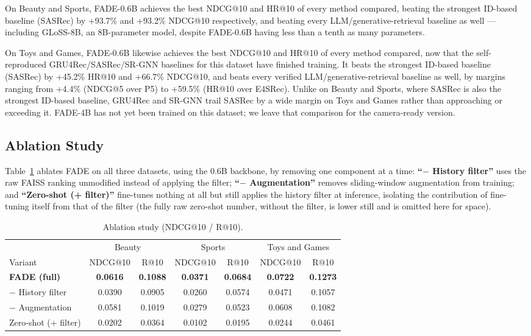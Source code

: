 \documentclass[runningheads]{llncs}
\begin{document}
On Beauty and Sports, FADE-0.6B achieves the best NDCG@10 and HR@10 of every method compared, beating the strongest ID-based baseline (SASRec) by +93.7\% and +93.2\% NDCG@10 respectively, and beating every LLM/generative-retrieval baseline as well --- including GLoSS-8B, an 8B-parameter model, despite FADE-0.6B having less than a tenth as many parameters.

On Toys and Games, FADE-0.6B likewise achieves the best NDCG@10 and HR@10 of every method compared, now that the self-reproduced GRU4Rec/SASRec/SR-GNN baselines for this dataset have finished training. It beats the strongest ID-based baseline (SASRec) by +45.2\% HR@10 and +66.7\% NDCG@10, and beats every verified LLM/generative-retrieval baseline as well, by margins ranging from +4.4\% (NDCG@5 over P5) to +59.5\% (HR@10 over E4SRec). Unlike on Beauty and Sports, where SASRec is also the strongest ID-based baseline, GRU4Rec and SR-GNN trail SASRec by a wide margin on Toys and Games rather than approaching or exceeding it. FADE-4B has not yet been trained on this dataset; we leave that comparison for the camera-ready version.

\subsection{Ablation Study}
\label{sec:ablation}
Table~\ref{tab:ablation} ablates FADE on all three datasets, using the 0.6B backbone, by removing one component at a time: \textbf{``$-$ History filter''} uses the raw FAISS ranking unmodified instead of applying the filter; \textbf{``$-$ Augmentation''} removes sliding-window augmentation from training; and \textbf{``Zero-shot (+ filter)''} fine-tunes nothing at all but still applies the history filter at inference, isolating the contribution of fine-tuning itself from that of the filter (the fully raw zero-shot number, without the filter, is lower still and is omitted here for space).

\begin{table}[H]
\centering
\caption{Ablation study (NDCG@10 / R@10).}
\label{tab:ablation}
\footnotesize
\begin{tabular}{lcccccc}
\toprule
& \multicolumn{2}{c}{Beauty} & \multicolumn{2}{c}{Sports} & \multicolumn{2}{c}{Toys and Games} \\
\cmidrule(lr){2-3} \cmidrule(lr){4-5} \cmidrule(lr){6-7}
Variant & NDCG@10 & R@10 & NDCG@10 & R@10 & NDCG@10 & R@10 \\
\midrule
\textbf{FADE (full)}    & \textbf{0.0616} & \textbf{0.1088} & \textbf{0.0371} & \textbf{0.0684} & \textbf{0.0722} & \textbf{0.1273} \\
$-$ History filter      & 0.0390 & 0.0905 & 0.0260 & 0.0574 & 0.0471 & 0.1057 \\
$-$ Augmentation        & 0.0581 & 0.1019 & 0.0279 & 0.0523 & 0.0608 & 0.1082 \\
Zero-shot (+ filter)    & 0.0202 & 0.0364 & 0.0102 & 0.0195 & 0.0244 & 0.0461 \\
\bottomrule
\end{tabular}
\end{table}
\end{document}
